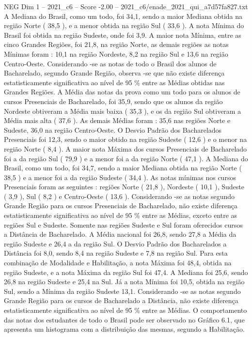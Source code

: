 \begin{textsample}{NEG Dim 1 – 2021\_c6 – Score -2.00 – 2021\_c6/enade\_2021\_qui\_a7d57fa827.txt}
A Mediana do Brasil, como um todo, foi 34,1, sendo a maior Mediana obtida na região Norte ( 38,5 ), e a menor obtida na região Sul ( 33,6 ).
A nota Mínima do Brasil foi obtida na região Sudeste, onde foi 3,9.
A maior nota Mínima, entre as cinco Grandes Regiões, foi 21,8, na região Norte, as demais regiões as notas Mínimas foram : 10,1 na região Nordeste, 8,2 na região Sul e 13,6 na região Centro-Oeste.
Considerando -se as notas de todo o Brasil dos alunos de Bacharelado, segundo Grande Região, observa -se que não existe diferença estatisticamente significativa ao nível de 95 \% entre as Médias obtidas nas Grandes Regiões.
A Média das notas da prova como um todo para os alunos de cursos Presenciais de Bacharelado, foi 35,9, sendo que os alunos da região Nordeste obtiveram a Média mais baixa ( 35,3 ), e os da região Sul obtiveram a Média mais alta ( 37,6 ).
As demais Médias foram : 35,6 nas regiões Norte e Sudeste, 36,0 na região Centro-Oeste.
O Desvio Padrão dos Bacharelados Presenciais foi 12,3, sendo o maior obtido na região Sudeste ( 12,6 ) e o menor na região Norte ( 8,4 ).
A maior nota Máxima dos cursos Presenciais de Bacharelado foi a da região Sul ( 79,9 ) e a menor foi a da região Norte ( 47,1 ).
A Mediana do Brasil, como um todo, foi 34,7, sendo a maior Mediana obtida na região Norte ( 38,5 ) e a menor foi a da região Sudeste ( 34,4 ).
As notas mínimas nos cursos Presenciais foram as seguintes : regiões Norte ( 21,8 ), Nordeste ( 10,1 ), Sudeste ( 3,9 ), Sul ( 8,2 ) e Centro-Oeste ( 13,6 ).
Considerando -se as notas segundo Grande Região para os cursos Presenciais de Bacharelado, não existe diferença estatisticamente significativa ao nível de 95 \% entre as Médias, exceto entre as regiões Sul e Sudeste.
Somente nas regiões Sudeste e Sul foram oferecidos cursos a Distância de Bacharelado.
A Média nacional foi 26,8, sendo 27,8 a Média da região Sudeste e 26,4 a da região Sul.
O Desvio Padrão dos Bacharelados a Distância foi 8,0, sendo 8,4 na região Sudeste e 7,8 na região Sul.
Para esta combinação de Modalidade e Habilitação, a nota Máxima foi 48,4, obtida na região Sudeste, e a nota Máxima da região Sul foi 47,4.
A Mediana foi 25,6, sendo 26,8 na região Sudeste e 25,4 na Sul.
Já a nota Mínima foi 10,5, obtida na região Sul, sendo a Mínima da região Sudeste 13,1.
Considerando -se as notas segundo Grande Região para os cursos de Bacharelado a Distância, não existe diferença estatisticamente significativa ao nível de 95 \% entre as Médias.
O comportamento das notas dos estudantes de todo o Brasil pode ser observado no Gráfico 6.1, que apresenta um histograma com a distribuição das mesmas, segundo a Habilitação.

\end{textsample}
